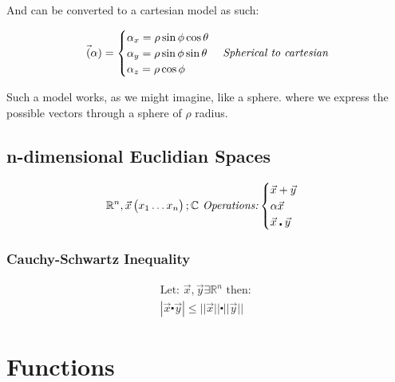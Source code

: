 \documentclass[11pt,fleqn]{book} %
\begin{document}
And can be converted to a cartesian model as such:

\begin{gather}
    \vec(\alpha) =
    \begin{cases}
        \alpha_x = \rho \sin \phi \cos \theta \\
        \alpha_y = \rho \sin \phi \sin \theta \\
        \alpha_z = \rho \cos \phi
    \end{cases}
    \text{\textit{Spherical to cartesian}}
\end{gather}

Such a model works, as we might imagine, like a sphere. where we express the possible vectors
through a sphere of $ \rho $ radius.

\section{n-dimensional Euclidian Spaces}

\begin{equation}
    \mathbb{R}^n, \vec{x} \begin{pmatrix}
        x_1
        \dots
        x_n
    \end{pmatrix}
    ; \mathbb{C}
    \text{\textit{ Operations:}}
    \begin{cases}
        \vec{x}+\vec{y} \\
        \alpha \vec{x} \\
        \vec{x} \centerdot \vec{y} \\
    \end{cases}
\end{equation}


\subsection*{Cauchy-Schwartz Inequality}

\begin{gather}
    \text{Let: } \vec{x},\vec{y} \exists \mathbb{R}^n \text{ then: }\\
    |\vec{x}\centerdot\vec{y}| \le ||\vec{x}|| \centerdot ||\vec{y}||
\end{gather}

\chapter{Functions}









\end{document}
